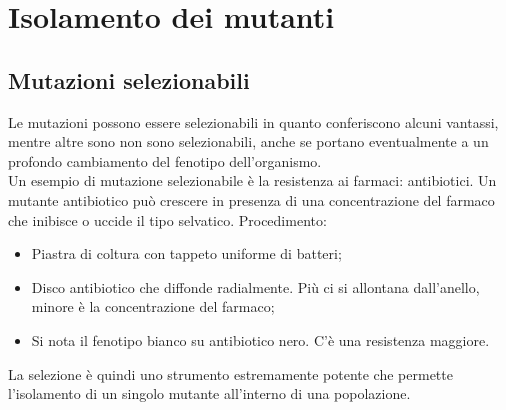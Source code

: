 \section{Isolamento dei mutanti}
\subsection{Mutazioni selezionabili}
Le mutazioni possono essere selezionabili in quanto conferiscono alcuni vantassi, mentre altre sono non sono selezionabili, anche se portano eventualmente a un profondo cambiamento del fenotipo dell'organismo. 
\\Un esempio di mutazione selezionabile è la resistenza ai farmaci: antibiotici. Un mutante antibiotico può crescere in presenza di una concentrazione del farmaco che inibisce o uccide il tipo selvatico. Procedimento:
\begin{itemize}
    \item Piastra di coltura con tappeto uniforme di batteri; 
    \item Disco antibiotico che diffonde radialmente. Più ci si allontana dall'anello, minore è la concentrazione del farmaco; 
    \item Si nota il fenotipo bianco su antibiotico nero. C'è una resistenza maggiore.
\end{itemize}
La selezione è quindi uno strumento estremamente potente che permette l'isolamento di un singolo mutante all'interno di una popolazione. 
